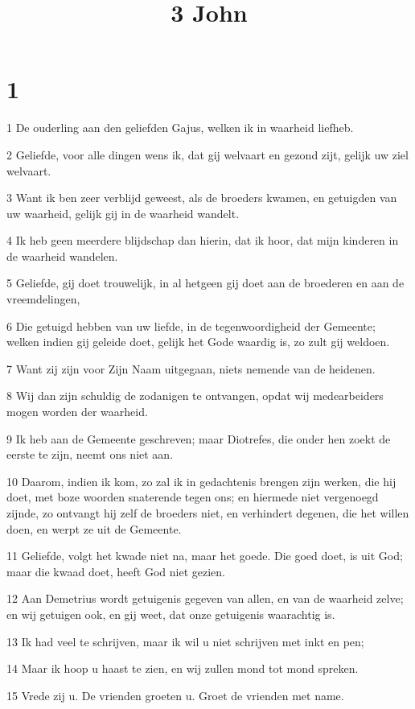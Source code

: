 

\title{3 John}



\chapter{1}

\par 1 De ouderling aan den geliefden Gajus, welken ik in waarheid liefheb.
\par 2 Geliefde, voor alle dingen wens ik, dat gij welvaart en gezond zijt, gelijk uw ziel welvaart.
\par 3 Want ik ben zeer verblijd geweest, als de broeders kwamen, en getuigden van uw waarheid, gelijk gij in de waarheid wandelt.
\par 4 Ik heb geen meerdere blijdschap dan hierin, dat ik hoor, dat mijn kinderen in de waarheid wandelen.
\par 5 Geliefde, gij doet trouwelijk, in al hetgeen gij doet aan de broederen en aan de vreemdelingen,
\par 6 Die getuigd hebben van uw liefde, in de tegenwoordigheid der Gemeente; welken indien gij geleide doet, gelijk het Gode waardig is, zo zult gij weldoen.
\par 7 Want zij zijn voor Zijn Naam uitgegaan, niets nemende van de heidenen.
\par 8 Wij dan zijn schuldig de zodanigen te ontvangen, opdat wij medearbeiders mogen worden der waarheid.
\par 9 Ik heb aan de Gemeente geschreven; maar Diotrefes, die onder hen zoekt de eerste te zijn, neemt ons niet aan.
\par 10 Daarom, indien ik kom, zo zal ik in gedachtenis brengen zijn werken, die hij doet, met boze woorden snaterende tegen ons; en hiermede niet vergenoegd zijnde, zo ontvangt hij zelf de broeders niet, en verhindert degenen, die het willen doen, en werpt ze uit de Gemeente.
\par 11 Geliefde, volgt het kwade niet na, maar het goede. Die goed doet, is uit God; maar die kwaad doet, heeft God niet gezien.
\par 12 Aan Demetrius wordt getuigenis gegeven van allen, en van de waarheid zelve; en wij getuigen ook, en gij weet, dat onze getuigenis waarachtig is.
\par 13 Ik had veel te schrijven, maar ik wil u niet schrijven met inkt en pen;
\par 14 Maar ik hoop u haast te zien, en wij zullen mond tot mond spreken.
\par 15 Vrede zij u. De vrienden groeten u. Groet de vrienden met name.


